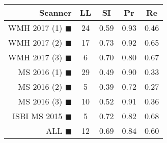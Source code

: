 \begin{tabular}{rcccc}
\toprule
Scanner & LL & SI & Pr & Re \\
\midrule
WMH 2017 (1) {\color[rgb]{ 1.00 0.00 0.00}$\blacksquare$} & 24 & 0.59 & 0.93 & 0.46 \\
WMH 2017 (2) {\color[rgb]{ 1.00 0.50 0.00}$\blacksquare$} & 17 & 0.73 & 0.92 & 0.65 \\
WMH 2017 (3) {\color[rgb]{ 1.00 0.80 0.00}$\blacksquare$} & 6 & 0.70 & 0.80 & 0.67 \\
MS  2016 (1) {\color[rgb]{ 0.20 0.80 0.00}$\blacksquare$} & 29 & 0.49 & 0.90 & 0.33 \\
MS  2016 (2) {\color[rgb]{ 0.00 0.40 1.00}$\blacksquare$} & 5 & 0.39 & 0.72 & 0.27 \\
MS  2016 (3) {\color[rgb]{ 0.60 0.00 1.00}$\blacksquare$} & 10 & 0.52 & 0.91 & 0.36 \\
ISBI MS 2015 {\color[rgb]{ 1.00 0.00 1.00}$\blacksquare$} & 5 & 0.72 & 0.82 & 0.68 \\
\midrule
ALL {\color[rgb]{ 1.00 1.00 1.00}$\blacksquare$} & 12 & 0.69 & 0.84 & 0.60 \\
\bottomrule
\end{tabular}
